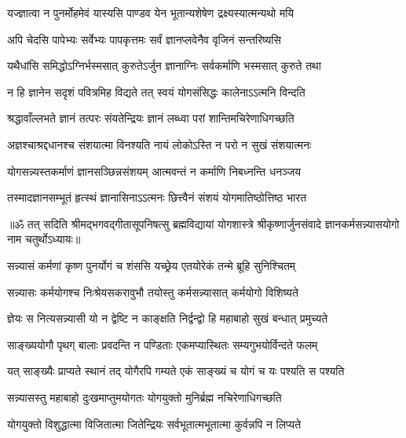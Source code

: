 \twolineshloka
{यज्ज्ञात्वा न पुनर्मोहमेवं यास्यसि पाण्डव}
{येन भूतान्यशेषेण द्रक्ष्यस्यात्मन्यथो मयि}%

\twolineshloka
{अपि चेदसि पापेभ्यः सर्वेभ्यः पापकृत्तमः}
{सर्वं ज्ञानप्लवेनैव वृजिनं सन्तरिष्यसि}%

\twolineshloka
{यथैधांसि समिद्धोऽग्निर्भस्मसात् कुरुतेऽर्जुन}
{ज्ञानाग्निः सर्वकर्माणि भस्मसात् कुरुते तथा}%

\twolineshloka
{न हि ज्ञानेन सदृशं पवित्रमिह विद्यते}
{तत् स्वयं योगसंसिद्धः कालेनाऽऽत्मनि विन्दति}%

\twolineshloka
{श्रद्धावाँल्लभते ज्ञानं तत्परः संयतेन्द्रियः}
{ज्ञानं लब्ध्वा परां शान्तिमचिरेणाधिगच्छति}%

\twolineshloka
{अज्ञश्चाश्रद्दधानश्च संशयात्मा विनश्यति}
{नायं लोकोऽस्ति न परो न सुखं संशयात्मनः}%

\twolineshloka
{योगसन्न्यस्तकर्माणं ज्ञानसञ्छिन्नसंशयम्}
{आत्मवन्तं न कर्माणि निबध्नन्ति धनञ्जय}%

\twolineshloka
{तस्मादज्ञानसम्भूतं हृत्स्थं ज्ञानासिनाऽऽत्मनः}
{छित्त्वैनं संशयं योगमातिष्ठोत्तिष्ठ भारत}%

{॥ॐ तत् सदिति श्रीमद्भगवद्गीतासूपनिषत्सु ब्रह्मविद्यायां योगशास्त्रे श्रीकृष्णार्जुनसंवादे ज्ञानकर्मसन्न्यासयोगो नाम चतुर्थोऽध्यायः॥}



\twolineshloka
{सन्न्यासं कर्मणां कृष्ण पुनर्योगं च शंससि}
{यच्छ्रेय एतयोरेकं तन्मे ब्रूहि सुनिश्चितम्}%


\twolineshloka
{सन्न्यासः कर्मयोगश्च निःश्रेयसकरावुभौ}
{तयोस्तु कर्मसन्न्यासात् कर्मयोगो विशिष्यते}%

\twolineshloka
{ज्ञेयः स नित्यसन्न्यासी यो न द्वेष्टि न काङ्क्षति}
{निर्द्वन्द्वो हि महाबाहो सुखं बन्धात् प्रमुच्यते}%

\twolineshloka
{साङ्ख्ययोगौ पृथग् बालाः प्रवदन्ति न पण्डिताः}
{एकमप्यास्थितः सम्यगुभयोर्विन्दते फलम्}%

\twolineshloka
{यत् साङ्ख्यैः प्राप्यते स्थानं तद् योगैरपि गम्यते}
{एकं साङ्ख्यं च योगं च यः पश्यति स पश्यति}%

\twolineshloka
{सन्न्यासस्तु महाबाहो दुःखमाप्तुमयोगतः}
{योगयुक्तो मुनिर्ब्रह्म नचिरेणाधिगच्छति}%

\twolineshloka
{योगयुक्तो विशुद्धात्मा विजितात्मा जितेन्द्रियः}
{सर्वभूतात्मभूतात्मा कुर्वन्नपि न लिप्यते}%

